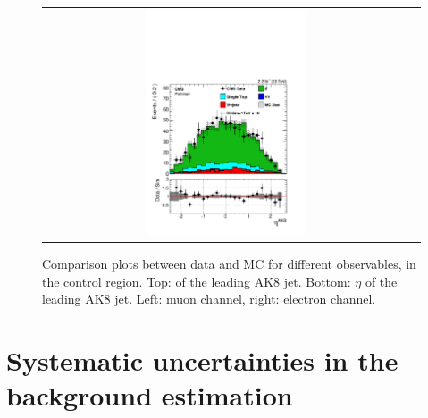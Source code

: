 \begin{figure}[htbp]
\begin{tabular}{cc}
 \includegraphics[width=0.45\textwidth]{chapters/Chapter8-EventSelection/Figures/WVanalysis/ControlPlots_TTbar/el/ungroomed_jet_eta_0}\\
 \end{tabular}
 \caption{Comparison plots between data and MC for different observables, in the \ttbar control region.
 Top: \pt of the leading AK8 jet. Bottom: $\eta$ of the leading AK8 jet. 
 Left: muon channel, right: electron channel. }
 \label{fig:TTbar_controlPlots_3}
 \end{figure}
 
 \clearpage
\section{Systematic uncertainties in the background estimation}
